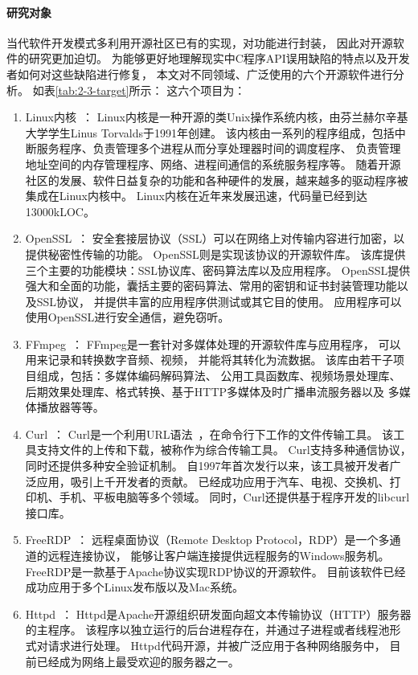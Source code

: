 \paragraph{研究对象}


当代软件开发模式多利用开源社区已有的实现，对功能进行封装，
因此对开源软件的研究更加迫切。
为能够更好地理解现实中C程序API误用缺陷的特点以及开发者如何对这些缺陷进行修复，
本文对不同领域、广泛使用的六个开源软件进行分析。
如表\ref{tab:2-3-target}所示：
这六个项目为：
\begin{enumerate}
	\item Linux内核~\cite{linux}：
	Linux内核是一种开源的类Unix操作系统内核，由芬兰赫尔辛基大学学生Linus Torvalds于1991年创建。
	该内核由一系列的程序组成，包括中断服务程序、负责管理多个进程从而分享处理器时间的调度程序、
	负责管理地址空间的内存管理程序、网络、进程间通信的系统服务程序等。
	随着开源社区的发展、软件日益复杂的功能和各种硬件的发展，越来越多的驱动程序被集成在Linux内核中。
	Linux内核在近年来发展迅速，代码量已经到达13000kLOC。
	
	\item OpenSSL~\cite{openssl}：
	安全套接层协议（SSL）可以在网络上对传输内容进行加密，以提供秘密性传输的功能。
	OpenSSL则是实现该协议的开源软件库。
	该库提供三个主要的功能模块：SSL协议库、密码算法库以及应用程序。
	OpenSSL提供强大和全面的功能，囊括主要的密码算法、常用的密钥和证书封装管理功能以及SSL协议，
	并提供丰富的应用程序供测试或其它目的使用。
	应用程序可以使用OpenSSL进行安全通信，避免窃听。
	
	
	\item FFmpeg~\cite{ffmpeg}：
	FFmpeg是一套针对多媒体处理的开源软件库与应用程序，
	可以用来记录和转换数字音频、视频，
	并能将其转化为流数据。
	该库由若干子项目组成，包括：多媒体编码解码算法、
	公用工具函数库、视频场景处理库、
	后期效果处理库、格式转换、基于HTTP多媒体及时广播串流服务器以及
	多媒体播放器等等。
	
	\item Curl~\cite{curl}：
	Curl是一个利用URL语法~\cite{url}，在命令行下工作的文件传输工具。
	该工具支持文件的上传和下载，被称作为综合传输工具。
	Curl支持多种通信协议，同时还提供多种安全验证机制。
	自1997年首次发行以来，该工具被开发者广泛应用，吸引上千开发者的贡献。
	已经成功应用于汽车、电视、交换机、打印机、手机、平板电脑等多个领域。
	同时，Curl还提供基于程序开发的libcurl接口库。
	
	\item FreeRDP~\cite{freerdp}：
	远程桌面协议（Remote Desktop Protocol，RDP）是一个多通道的远程连接协议，
	能够让客户端连接提供远程服务的Windows服务机。
	FreeRDP是一款基于Apache协议实现RDP协议的开源软件。
	目前该软件已经成功应用于多个Linux发布版以及Mac系统。
	
	
	\item Httpd~\cite{httpd}：
	Httpd是Apache开源组织研发面向超文本传输协议（HTTP）服务器的主程序。
	该程序以独立运行的后台进程存在，并通过子进程或者线程池形式对请求进行处理。
	Httpd代码开源，并被广泛应用于各种网络服务中，
	目前已经成为网络上最受欢迎的服务器之一。
	
\end{enumerate}

